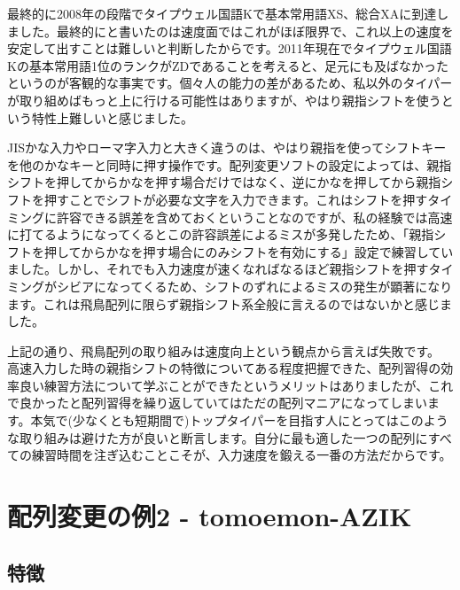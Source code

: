 最終的に2008年の段階でタイプウェル国語Kで基本常用語XS、総合XAに到達しました。最終的にと書いたのは速度面ではこれがほぼ限界で、これ以上の速度を安定して出すことは難しいと判断したからです。2011年現在でタイプウェル国語Kの基本常用語1位のランクがZDであることを考えると、足元にも及ばなかったというのが客観的な事実です。個々人の能力の差があるため、私以外のタイパーが取り組めばもっと上に行ける可能性はありますが、やはり親指シフトを使うという特性上難しいと感じました。

JISかな入力やローマ字入力と大きく違うのは、やはり親指を使ってシフトキーを他のかなキーと同時に押す操作です。配列変更ソフトの設定によっては、親指シフトを押してからかなを押す場合だけではなく、逆にかなを押してから親指シフトを押すことでシフトが必要な文字を入力できます。これはシフトを押すタイミングに許容できる誤差を含めておくということなのですが、私の経験では高速に打てるようになってくるとこの許容誤差によるミスが多発したため、「親指シフトを押してからかなを押す場合にのみシフトを有効にする」設定で練習していました。しかし、それでも入力速度が速くなればなるほど親指シフトを押すタイミングがシビアになってくるため、シフトのずれによるミスの発生が顕著になります。これは飛鳥配列に限らず親指シフト系全般に言えるのではないかと感じました。

上記の通り、飛鳥配列の取り組みは速度向上という観点から言えば失敗です。
高速入力した時の親指シフトの特徴についてある程度把握できた、配列習得の効率良い練習方法について学ぶことができたというメリットはありましたが、これで良かったと配列習得を繰り返していてはただの配列マニアになってしまいます。本気で(少なくとも短期間で)トップタイパーを目指す人にとってはこのような取り組みは避けた方が良いと断言します。自分に最も適した一つの配列にすべての練習時間を注ぎ込むことこそが、入力速度を鍛える一番の方法だからです。


\section{配列変更の例2 - tomoemon-AZIK}

\subsection{特徴}

